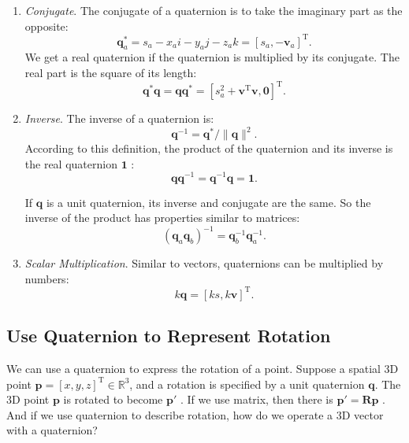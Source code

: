 \begin{enumerate}
    \item { \emph {Conjugate}}. The conjugate of a quaternion is to take the imaginary part as the opposite:
    \begin{equation}
    \mathbf{q}_a ^ * = s_a - x_ai - y_aj - z_ak = [s_a, - \mathbf{v}_a] ^ \mathrm{T}.
    \end{equation}
    We get a real quaternion if the quaternion is multiplied by its conjugate. The real part is the square of its length:
    \begin{equation}
    \mathbf{q}^* \mathbf{q} = \mathbf{q} \mathbf{q}^* = [s_a^2+\mathbf{v}^\mathrm{T} \mathbf{v}, \mathbf{0} ]^\mathrm{T}.
    \end{equation}
    
    \item { \emph{Inverse}}. The inverse of a quaternion is:
    \begin{equation}
    \label{eq:quaternionInverse}
    \mathbf{q} ^ { - 1 } = \mathbf{q} ^ * / \| \mathbf{q} \| ^ 2 .       
    \end{equation}
    According to this definition, the product of the quaternion and its inverse is the real quaternion $ \mathbf {1} $ :
    \begin{equation}
    \mathbf{q} \mathbf{q}^{-1} = \mathbf{q}^{-1} \mathbf{q} = \mathbf{1}.
    \end{equation}
    
    If $ \mathbf{q} $ is a unit quaternion, its inverse and conjugate are the same. So the inverse of the product has properties similar to matrices:
    \begin{equation}
    \left( \mathbf{q}_a \mathbf{q}_b \right)^{-1} = \mathbf{q}_b^{-1} \mathbf{q}_a^{-1}.
    \end{equation}
    
    \item { \emph {Scalar Multiplication}.} Similar to vectors, quaternions can be multiplied by numbers:
    \begin{equation}
    k \mathbf{q} = \left[ ks, k\mathbf{v} \right]^\mathrm{T}.
    \end{equation}
\end{enumerate}

\subsection{Use Quaternion to Represent Rotation}

We can use a quaternion to express the rotation of a point. Suppose a spatial 3D point $ \mathbf{p} = [x,y,z]^\mathrm{T} \in  \mathbb {R}^3$, and a rotation is specified by a unit quaternion $ \mathbf{q}$. The 3D point $\mathbf{p}$ is rotated to become $\mathbf{p}'$ . If we use matrix, then there is $ \mathbf{p}'= \mathbf{R} \mathbf{p} $ . And if we use quaternion to describe rotation, how do we operate a 3D vector with a quaternion? 

